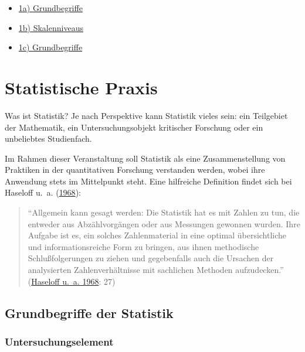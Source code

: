 \documentclass[
  11pt,
  ngerman,
  a4paper,
]{report}
\providecommand{\tightlist}{%
  \setlength{\itemsep}{0pt}\setlength{\parskip}{0pt}}
\begin{document}
\begin{itemize}
\tightlist
\item
  \href{https://video01.uni-frankfurt.de/Mediasite/Play/36dca452df154bd3b7be2e069174e8991d}{1a) Grundbegriffe}
\item
  \href{https://video01.uni-frankfurt.de/Mediasite/Play/5a397035f7a6468fa2cecf802ca8d52a1d}{1b) Skalenniveaus}
\item
  \href{https://video01.uni-frankfurt.de/Mediasite/Play/5fce0458009b4da283b14fdc30e3a0ea1d}{1c) Grundbegriffe}
\end{itemize}

\hypertarget{statistische-praxis}{%
\section{Statistische Praxis}\label{statistische-praxis}}

Was ist Statistik? Je nach Perspektive kann Statistik vieles sein: ein Teilgebiet der Mathematik, ein Untersuchungsobjekt kritischer Forschung oder ein unbeliebtes Studienfach.

Im Rahmen dieser Veranstaltung soll Statistik als eine Zusammenstellung von Praktiken in der quantitativen Forschung verstanden werden, wobei ihre Anwendung stets im Mittelpunkt steht. Eine hilfreiche Definition findet sich bei Haseloff u.~a. (\protect\hyperlink{ref-haseloff}{1968}):

\begin{quote}
\enquote{Allgemein kann gesagt werden: Die Statistik hat es mit Zahlen zu tun, die entweder aus Abzählvorgängen oder aus Messungen gewonnen wurden. Ihre Aufgabe ist es, ein solches Zahlenmaterial in eine optimal übersichtliche und informationsreiche Form zu bringen, aus ihnen methodische Schlußfolgerungen zu ziehen und gegebenfalls auch die Ursachen der analysierten Zahlenverhältnisse mit sachlichen Methoden aufzudecken.} (\protect\hyperlink{ref-haseloff}{Haseloff u.~a. 1968}: 27)
\end{quote}

\hypertarget{grundbegriffe-der-statistik}{%
\subsection{Grundbegriffe der Statistik}\label{grundbegriffe-der-statistik}}

\nopagebreak

\hypertarget{untersuchungselement}{%
\subsubsection{Untersuchungselement}\label{untersuchungselement}}
\end{document}

